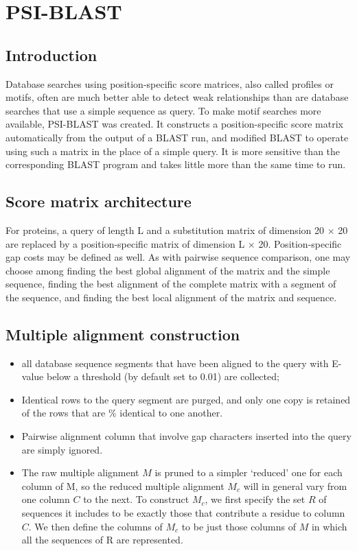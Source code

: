      
        
    \section{PSI-BLAST}
    
        \subsection{Introduction}
        Database searches using position-specific score matrices, also called profiles or motifs, often are much better able to detect weak relationships than are database searches that use a simple sequence as query. To make motif searches more available, PSI-BLAST was created. It constructs a position-specific score matrix automatically from the output of a BLAST run, and modified BLAST to operate using such a matrix in the place of a simple query. It is more sensitive than the corresponding BLAST program and takes little more than the same time to run. 
        \subsection{Score matrix architecture}
        For proteins, a query of length L and a substitution matrix of dimension 20 × 20 are replaced by a position-specific matrix of dimension L × 20. Position-specific gap costs may be defined as well. As with pairwise sequence comparison, one may choose among finding the best global alignment of the matrix and the simple sequence, finding the best alignment of the complete matrix with a segment of the sequence, and finding the best local alignment of the matrix and sequence.
            
        \subsection{Multiple alignment construction}
        \begin{itemize}
            \item all database sequence segments that have been aligned to the query with E-value below a threshold (by default set to 0.01) are collected;
            \item Identical rows to the query segment are purged, and only one copy is retained of the rows that are \% identical to one another.
            \item Pairwise alignment column that involve gap characters inserted into the query are simply ignored.
            \item  The raw multiple alignment $M$ is pruned to a simpler ‘reduced’ one for each column of M, so the reduced multiple alignment $M_c$ will in general vary from one column $C$ to the next. To construct $M_c$, we first specify the set $R$ of sequences it includes to be exactly those that contribute a residue to column $C$. We then define the columns of $M_c$ to be just those columns of $M$ in which all the sequences of R are represented.
        \end{itemize}
        
